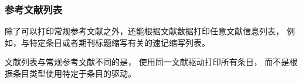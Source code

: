 \subsubsection{参考文献列表} %
\label{use:bib:biblist}


\biblatex 除了可以打印常规参考文献之外，还能根据文献数据打印任意文献信息列表，
例如，与特定条目或者期刊标题缩写有关的速记缩写列表。


文献列表与常规参考文献不同的是，
使用同一文献驱动打印所有条目，
而不是根据条目类型使用特定于条目的驱动。

